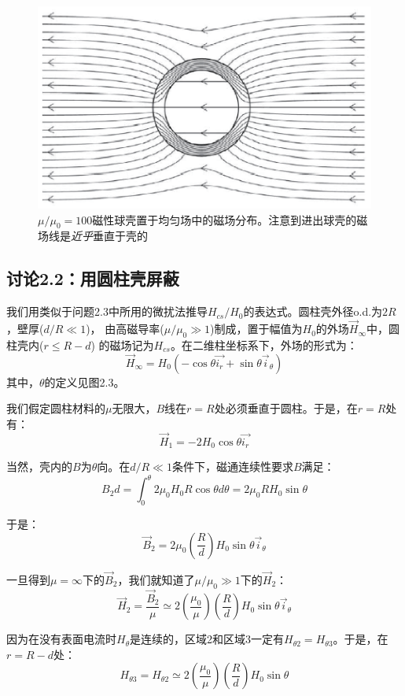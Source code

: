 \begin{figure}[htbp]
  \centering
 \includegraphics[scale=0.7]{chpt2/figs/fig2.6.eps}
  \caption{$\mu/\mu_0=100$磁性球壳置于均匀场中的磁场分布。注意到进出球壳的磁场线是\textit{近乎}垂直于壳的}
\end{figure}


\subsection{讨论2.2：用圆柱壳屏蔽}
我们用类似于问题2.3中所用的微扰法推导$H_{cs}/H_0$的表达式。圆柱壳外径o.d.为$2R$，壁厚($d/R\ll 1$)，
由高磁导率($\mu/\mu_0 \gg 1$)制成，置于幅值为$H_0$的外场$\vec{H}_\infty$中，圆柱壳内($r\le R-d$)
的磁场记为$H_{cs}$。在二维柱坐标系下，外场的形式为：
\begin{equation*}
\vec{H}_\infty =H_0 (-\cos\theta \vec{i_r}+\sin\theta\vec{i}_\theta) \tag{2.40}
\end{equation*}
其中，$\theta$的定义见图2.3。

我们假定圆柱材料的$\mu$无限大，$B$线在$r=R$处必须垂直于圆柱。于是，在$r=R$处有：
$$\vec{H}_1 =-2 H_0 \cos\theta \vec{i_r}$$

当然，壳内的$B$为$\theta$向。在$d/R\ll 1$条件下，磁通连续性要求$B$满足：
$$B_2 d=\int_{0}^{\theta}2\mu_0 H_0 R\cos\theta d\theta=2\mu_0 R H_0 \sin\theta$$

于是：
$$\vec{B}_2=2\mu_0 \left(\frac{R}{d}\right)H_0 \sin\theta \vec{i}_\theta$$

一旦得到$\mu=\infty$下的$\vec{B}_2$，我们就知道了$\mu/\mu_0 \gg 1$下的$\vec{H}_2$：
$$\vec{H}_2= \frac{\vec{B}_2}{\mu}\simeq 2\left(\frac{\mu_0}{\mu}\right) \left(\frac{R}{d}\right)H_0 \sin\theta \vec{i}_\theta$$

因为在没有表面电流时$H_\theta$是连续的，区域2和区域3一定有$H_{\theta 2}=H_{\theta 3}$。于是，在$r=R-d$处：
$$H_{\theta 3}=H_{\theta 2}\simeq 2\left(\frac{\mu_0}{\mu}\right) \left(\frac{R}{d}\right)H_0 \sin\theta$$

